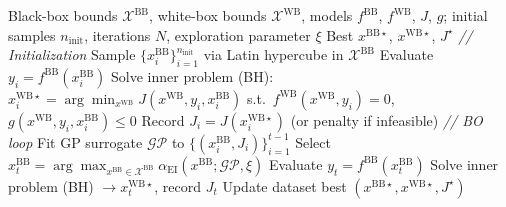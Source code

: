 \documentclass[12pt,a4paper]{article}%
\theoremstyle{plain}%
\theoremstyle{remark}%
\theoremstyle{definition}%
\def\WB{\mathrm{WB}}
\def\BB{\mathrm{BB}}
\begin{document}
\begin{algorithm}[htbp]
\caption{Bilevel Bayesian Optimization}\label{alg:bilevel_bo}
\begin{algorithmic}[1]
\Require Black-box bounds $\mathcal{X}^{\BB}$, white-box bounds $\mathcal{X}^{\WB}$, models $f^{\BB}$, $f^{\WB}$, $J$, $g$; initial samples $n_\text{init}$, iterations $N$, exploration parameter $\xi$
\Ensure Best $x^{\BB\star}$, $x^{\WB\star}$, $J^\star$
\Statex \textit{// Initialization}
\State Sample $\{x^{\BB}_i\}_{i=1}^{n_\text{init}}$ via Latin hypercube in $\mathcal{X}^{\BB}$
    \State Evaluate $y_i = f^{\BB}(x^{\BB}_i)$
    \State Solve inner problem (BH): $x^{\WB\star}_i = \arg\min_{x^{\WB}} J(x^{\WB}, y_i, x^{\BB}_i)$ s.t.\ $f^{\WB}(x^{\WB}, y_i)=0$, $g(x^{\WB}, y_i, x^{\BB}_i) \leq 0$
    \State Record $J_i = J(x^{\WB\star}_i)$ (or penalty if infeasible)
\EndFor
\Statex \textit{// BO loop}
    \State Fit GP surrogate $\mathcal{GP}$ to $\{(x^{\BB}_i, J_i)\}_{i=1}^{t-1}$
    \State Select $x^{\BB}_t = \arg\max_{x^{\BB} \in \mathcal{X}^{\BB}} \alpha_\text{EI}(x^{\BB}; \mathcal{GP}, \xi)$
    \State Evaluate $y_t = f^{\BB}(x^{\BB}_t)$
    \State Solve inner problem (BH) $\to x^{\WB\star}_t$, record $J_t$
    \State Update dataset
\EndFor
\State \Return best $(x^{\BB\star}, x^{\WB\star}, J^\star)$
\end{algorithmic}
\end{algorithm}
\end{document}
